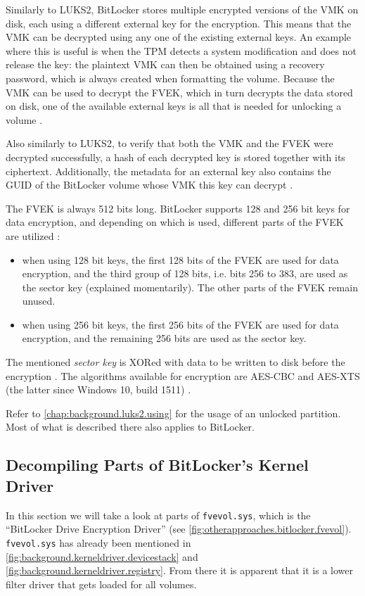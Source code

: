 Similarly to LUKS2, BitLocker stores multiple encrypted versions of the VMK on disk, each using a different external key for the encryption. This means that the VMK can be decrypted using any one of the existing external keys. An example where this is useful is when the TPM detects a system modification and does not release the key: the plaintext VMK can then be obtained using a recovery password, which is always created when formatting the volume. Because the VMK can be used to decrypt the FVEK, which in turn decrypts the data stored on disk, one of the available external keys is all that is needed for unlocking a volume \cite{Kornblum2009}.

Also similarly to LUKS2, to verify that both the VMK and the FVEK were decrypted successfully, a hash of each decrypted key is stored together with its ciphertext. Additionally, the metadata for an external key also contains the GUID of the BitLocker volume whose VMK this key can decrypt \cite{Kornblum2009}.

The FVEK is always 512 bits long. BitLocker supports 128 and 256 bit keys for data encryption, and depending on which is used, different parts of the FVEK are utilized \cite{Kornblum2009}:
\begin{itemize}
	\item when using 128 bit keys, the first 128 bits of the FVEK are used for data encryption, and the third group of 128 bits, i.e. bits 256 to 383, are used as the sector key (explained momentarily). The other parts of the FVEK remain unused.
	\item when using 256 bit keys, the first 256 bits of the FVEK are used for data encryption, and the remaining 256 bits are used as the sector key.
\end{itemize}

The mentioned \emph{sector key} is XORed with data to be written to disk before the encryption \cite{Kornblum2009}. The algorithms available for encryption are AES-CBC and AES-XTS (the latter since Windows 10, build 1511) \cite{Sosnowski2016}.

Refer to \autoref{chap:background.luks2.using} for the usage of an unlocked partition. Most of what is described there also applies to BitLocker.

\subsection{Decompiling Parts of BitLocker's Kernel Driver}
\label{chap:otherapproaches.bitlocker.decompiling}
In this section we will take a look at parts of \texttt{fvevol.sys}, which is the ``BitLocker Drive Encryption Driver'' (see \autoref{fig:otherapproaches.bitlocker.fvevol}). \texttt{fvevol.sys} has already been mentioned in \autoref{fig:background.kerneldriver.devicestack} and \autoref{fig:background.kerneldriver.registry}. From there it is apparent that it is a lower filter driver that gets loaded for all volumes.

